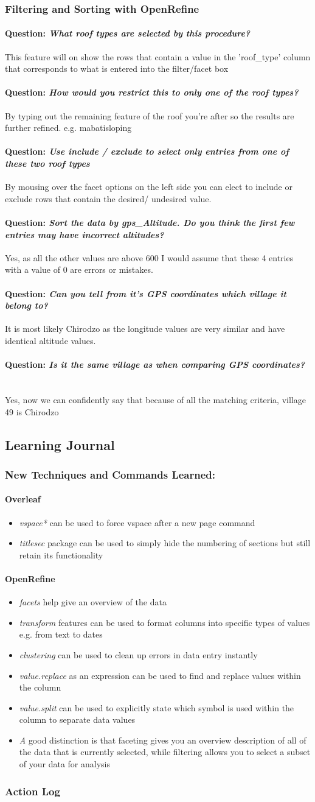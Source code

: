 \documentclass[12pt]{article}
\newcommand{\learning}[2]{\item \textit{#1} \textnormal{#2}}
\newcommand{\question}[1]{\paragraph{Question: {\textnormal{\textit{#1}}} ~\\}}
\begin{document}
\subsubsection{Filtering and Sorting with OpenRefine}
\question{What roof types are selected by this procedure?}
This feature will on show the rows that contain a value in the 'roof\_type' column that corresponds to what is entered into the filter/facet box
\question{How would you restrict this to only one of the roof types?}
By typing out the remaining feature of the roof you're after so the results are further refined. e.g. mabatisloping
\question{Use include / exclude to select only entries from one of these two roof types}
By mousing over the facet options on the left side you can elect to include or exclude rows that contain the desired/ undesired value.
\question{Sort the data by gps\_Altitude. Do you think the first few entries may have incorrect altitudes?}
Yes, as all the other values are above 600 I would assume that these 4 entries with a value of 0 are errors or mistakes.
\question{Can you tell from it’s GPS coordinates which village it belong to?}
It is most likely Chirodzo as the longitude values are very similar and have identical altitude values. 
\question{Is it the same village as when comparing GPS coordinates?}
Yes, now we can confidently say that because of all the matching criteria, village 49 is Chirodzo
\subsection{Learning Journal}
\subsubsection{New Techniques and Commands Learned:}
\paragraph{Overleaf}
\begin{itemize}
    \learning{vspace*}{can be used to force vspace after a new page command}
    \learning{titlesec}{package can be used to simply hide the numbering of sections but still retain its functionality}
\end{itemize}
\paragraph{OpenRefine}
\begin{itemize}
    \learning{facets}{help give an overview of the data}
    \learning{transform}{features can be used to format columns into specific types of values e.g. from text to dates}
    \learning{clustering}{can be used to clean up errors in data entry instantly}
    \learning{value.replace}{as an expression can be used to find and replace values within the column}
    \learning{value.split}{can be used to explicitly state which symbol is used within the column to separate data values}
    \learning{A}{good distinction is that faceting gives you an overview description of all of the data that is currently selected, while filtering allows you to select a subset of your data for analysis}
\end{itemize}
\subsubsection{Action Log}
\end{document}
